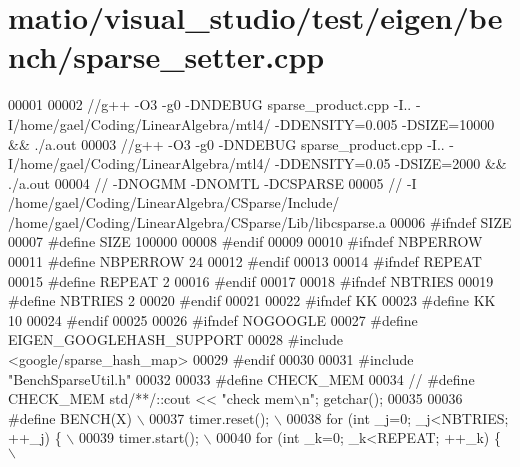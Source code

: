 \hypertarget{matio_2visual__studio_2test_2eigen_2bench_2sparse__setter_8cpp_source}{}\section{matio/visual\+\_\+studio/test/eigen/bench/sparse\+\_\+setter.cpp}
\label{matio_2visual__studio_2test_2eigen_2bench_2sparse__setter_8cpp_source}

\begin{DoxyCode}
00001 
00002 \textcolor{comment}{//g++ -O3 -g0 -DNDEBUG  sparse\_product.cpp -I.. -I/home/gael/Coding/LinearAlgebra/mtl4/ -DDENSITY=0.005
       -DSIZE=10000 && ./a.out}
00003 \textcolor{comment}{//g++ -O3 -g0 -DNDEBUG  sparse\_product.cpp -I.. -I/home/gael/Coding/LinearAlgebra/mtl4/ -DDENSITY=0.05
       -DSIZE=2000 && ./a.out}
00004 \textcolor{comment}{// -DNOGMM -DNOMTL -DCSPARSE}
00005 \textcolor{comment}{// -I /home/gael/Coding/LinearAlgebra/CSparse/Include/
       /home/gael/Coding/LinearAlgebra/CSparse/Lib/libcsparse.a}
00006 \textcolor{preprocessor}{#ifndef SIZE}
00007 \textcolor{preprocessor}{#define SIZE 100000}
00008 \textcolor{preprocessor}{#endif}
00009 
00010 \textcolor{preprocessor}{#ifndef NBPERROW}
00011 \textcolor{preprocessor}{#define NBPERROW 24}
00012 \textcolor{preprocessor}{#endif}
00013 
00014 \textcolor{preprocessor}{#ifndef REPEAT}
00015 \textcolor{preprocessor}{#define REPEAT 2}
00016 \textcolor{preprocessor}{#endif}
00017 
00018 \textcolor{preprocessor}{#ifndef NBTRIES}
00019 \textcolor{preprocessor}{#define NBTRIES 2}
00020 \textcolor{preprocessor}{#endif}
00021 
00022 \textcolor{preprocessor}{#ifndef KK}
00023 \textcolor{preprocessor}{#define KK 10}
00024 \textcolor{preprocessor}{#endif}
00025 
00026 \textcolor{preprocessor}{#ifndef NOGOOGLE}
00027 \textcolor{preprocessor}{#define EIGEN\_GOOGLEHASH\_SUPPORT}
00028 \textcolor{preprocessor}{#include <google/sparse\_hash\_map>}
00029 \textcolor{preprocessor}{#endif}
00030 
00031 \textcolor{preprocessor}{#include "BenchSparseUtil.h"}
00032 
00033 \textcolor{preprocessor}{#define CHECK\_MEM}
00034 \textcolor{comment}{// #define CHECK\_MEM  std/**/::cout << "check mem\(\backslash\)n"; getchar();}
00035 
00036 \textcolor{preprocessor}{#define BENCH(X) \(\backslash\)}
00037 \textcolor{preprocessor}{  timer.reset(); \(\backslash\)}
00038 \textcolor{preprocessor}{  for (int \_j=0; \_j<NBTRIES; ++\_j) \{ \(\backslash\)}
00039 \textcolor{preprocessor}{    timer.start(); \(\backslash\)}
00040 \textcolor{preprocessor}{    for (int \_k=0; \_k<REPEAT; ++\_k) \{ \(\backslash\)}

\end{DoxyCode}
